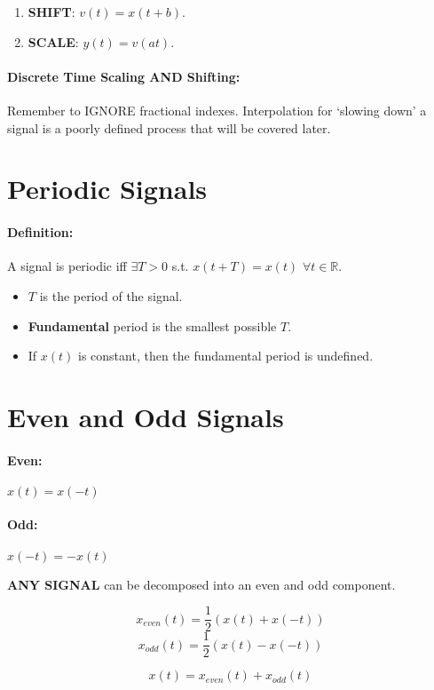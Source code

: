 \documentclass[a4paper,12pt]{report}
\def\reals{\mathbb{R}}
\begin{document}
\begin{enumerate}
\item \textbf{SHIFT}: $v(t) = x(t+b)$.
\item \textbf{SCALE}: $y(t) = v(at)$.
\end{enumerate}

\paragraph{Discrete Time Scaling AND Shifting: } Remember to IGNORE fractional indexes. Interpolation for `slowing down' a signal is a poorly defined process that will be covered later.

\section{Periodic Signals}

\paragraph{Definition: } A signal is periodic iff $\exists T > 0$ s.t. $x(t+T) = x(t)$ $\forall t\in\reals$. 

\begin{itemize}
\item $T$ is the period of the signal.
\item \textbf{Fundamental} period is the smallest possible $T$.
\item If $x(t)$ is constant, then the fundamental period is undefined.
\end{itemize}

\section{Even and Odd Signals}

\paragraph{Even: } $x(t) = x(-t)$
\paragraph{Odd: } $x(-t) = -x(t)$

\textbf{ANY SIGNAL} can be decomposed into an even and odd component.

$$x_{even}(t) = \frac{1}{2} (x(t) + x(-t))$$
$$x_{odd}(t) = \frac{1}{2} (x(t) - x(-t))$$

$$x(t) = x_{even}(t) + x_{odd}(t)$$
\end{document}
